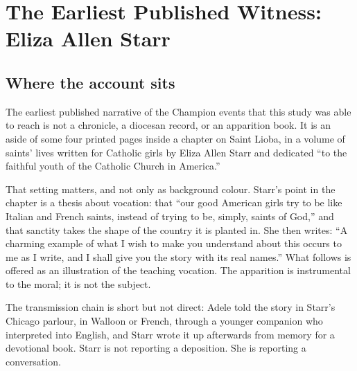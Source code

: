 \section{The Earliest Published Witness: Eliza Allen Starr}

\subsection{Where the account sits}

The earliest published narrative of the Champion events that this study
was able to reach is not a chronicle, a diocesan record, or an
apparition book. It is an aside of some four printed pages inside a
chapter on Saint Lioba, in a volume of saints' lives written for
Catholic girls by Eliza Allen Starr and dedicated ``to the faithful
youth of the Catholic Church in America.''

That setting matters, and not only as background colour. Starr's point
in the chapter is a thesis about vocation: that ``our good American
girls try to be like Italian and French saints, instead of trying to
be, simply, saints of God,'' and that sanctity takes the shape of the
country it is planted in. She then writes: ``A charming example of what
I wish to make you understand about this occurs to me as I write, and I
shall give you the story with its real names.'' What follows is offered
as an illustration of the teaching vocation. The apparition is
instrumental to the moral; it is not the subject.

The transmission chain is short but not direct: Adele told the story in
Starr's Chicago parlour, in Walloon or French, through a younger
companion who interpreted into English, and Starr wrote it up
afterwards from memory for a devotional book. Starr is not reporting a
deposition. She is reporting a conversation.

